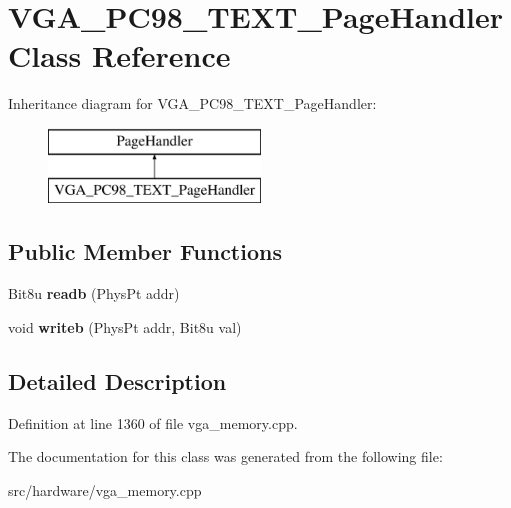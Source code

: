 \hypertarget{classVGA__PC98__TEXT__PageHandler}{\section{V\-G\-A\-\_\-\-P\-C98\-\_\-\-T\-E\-X\-T\-\_\-\-Page\-Handler Class Reference}
\label{classVGA__PC98__TEXT__PageHandler}
}
Inheritance diagram for V\-G\-A\-\_\-\-P\-C98\-\_\-\-T\-E\-X\-T\-\_\-\-Page\-Handler\-:\begin{figure}[H]
\begin{center}
\leavevmode
\includegraphics[height=2.000000cm]{classVGA__PC98__TEXT__PageHandler}
\end{center}
\end{figure}
\subsection*{Public Member Functions}
\begin{DoxyCompactItemize}
\item 
\hypertarget{classVGA__PC98__TEXT__PageHandler_a7313ad38bf12ab8ffd3707a513d7ff5d}{Bit8u {\bfseries readb} (Phys\-Pt addr)}\label{classVGA__PC98__TEXT__PageHandler_a7313ad38bf12ab8ffd3707a513d7ff5d}

\item 
\hypertarget{classVGA__PC98__TEXT__PageHandler_a1cd02680b1dd4c33aa48ac21a0476fbd}{void {\bfseries writeb} (Phys\-Pt addr, Bit8u val)}\label{classVGA__PC98__TEXT__PageHandler_a1cd02680b1dd4c33aa48ac21a0476fbd}

\end{DoxyCompactItemize}


\subsection{Detailed Description}


Definition at line 1360 of file vga\-\_\-memory.\-cpp.



The documentation for this class was generated from the following file\-:\begin{DoxyCompactItemize}
\item 
src/hardware/vga\-\_\-memory.\-cpp\end{DoxyCompactItemize}
